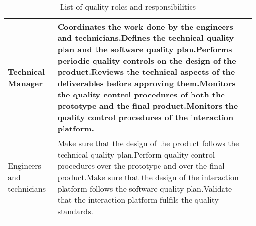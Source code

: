 \begin{longtable}[H]{>{\raggedright\arraybackslash}p{5cm} p{9cm}}
	\midrule
	
	Technical Manager & Coordinates the work done by the engineers and technicians.\vspace{0.3cm}\newline Defines the technical quality plan and the software quality plan.\vspace{0.3cm}\newline Performs periodic quality controls on the design of the product.\vspace{0.3cm}\newline Reviews the technical aspects of the deliverables before approving them.\vspace{0.3cm}\newline Monitors the quality control procedures of both the prototype and the final product.\vspace{0.3cm}\newline Monitors the quality control procedures of the interaction platform.\vspace{0.2cm} \\
	
	\midrule
	
	Engineers and technicians & Make sure that the design of the product follows the technical quality plan.\vspace{0.3cm}\newline Perform quality control procedures over the prototype and over the final product.\vspace{0.3cm}\newline Make sure that the design of the interaction platform follows the software quality plan.\vspace{0.3cm}\newline Validate that the interaction platform fulfils the quality standards.\vspace{0.2cm} \\
	
	\bottomrule[2pt]
	
	\caption{List of quality roles and responsibilities}
	
\end{longtable}